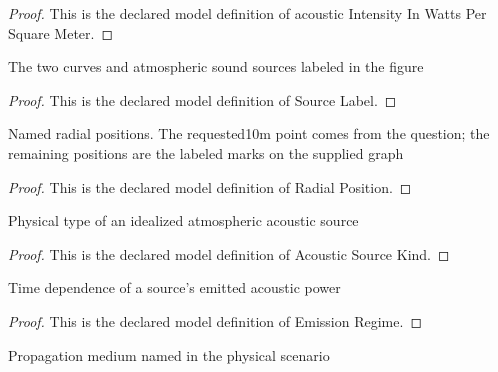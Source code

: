 \begin{proof}
  This is the declared model definition of acoustic Intensity In Watts Per Square Meter.
\end{proof}
\begin{definition}
  \label{def:physics:phyx-mini-0317:phyxminiproblems-problemphyxmini0317-sourcelabel}
  The two curves and atmospheric sound sources labeled in the figure
\end{definition}
\begin{proof}
  This is the declared model definition of Source Label.
\end{proof}
\begin{definition}
  \label{def:physics:phyx-mini-0317:phyxminiproblems-problemphyxmini0317-radialposition}
  Named radial positions. The requested10m point comes from the question; the remaining positions are the labeled marks on the supplied graph
\end{definition}
\begin{proof}
  This is the declared model definition of Radial Position.
\end{proof}
\begin{definition}
  \label{def:physics:phyx-mini-0317:phyxminiproblems-problemphyxmini0317-acousticsourcekind}
  Physical type of an idealized atmospheric acoustic source
\end{definition}
\begin{proof}
  This is the declared model definition of Acoustic Source Kind.
\end{proof}
\begin{definition}
  \label{def:physics:phyx-mini-0317:phyxminiproblems-problemphyxmini0317-emissionregime}
  Time dependence of a source's emitted acoustic power
\end{definition}
\begin{proof}
  This is the declared model definition of Emission Regime.
\end{proof}
\begin{definition}
  \label{def:physics:phyx-mini-0317:phyxminiproblems-problemphyxmini0317-acousticmedium}
  Propagation medium named in the physical scenario
\end{definition}

